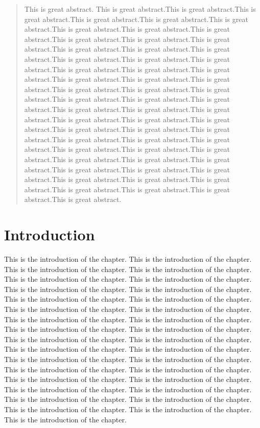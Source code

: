 \documentclass{nithreport}
\begin{document}
\tableofcontents
\listoftables
\listoffigures


\begin{abstract}
This is great abstract. This is great abstract.This is great abstract.This is great abstract.This is great abstract.This is great abstract.This is great abstract.This is great abstract.This is great abstract.This is great abstract.This is great abstract.This is great abstract.This is great abstract.This is great abstract.This is great abstract.This is great abstract.This is great abstract.This is great abstract.This is great abstract.This is great abstract.This is great abstract.This is great abstract.This is great abstract.This is great abstract.This is great abstract.This is great abstract.This is great abstract.This is great abstract.This is great abstract.This is great abstract.This is great abstract.This is great abstract.This is great abstract.This is great abstract.This is great abstract.This is great abstract.This is great abstract.This is great abstract.This is great abstract.This is great abstract.This is great abstract.This is great abstract.This is great abstract.This is great abstract.This is great abstract.This is great abstract.This is great abstract.This is great abstract.This is great abstract.This is great abstract.This is great abstract.This is great abstract.This is great abstract.This is great abstract.This is great abstract.This is great abstract.This is great abstract.This is great abstract.This is great abstract.
\end{abstract}


\chapter{Introduction}
This is the introduction of the chapter. This is the introduction of the chapter. This is the introduction of the chapter. This is the introduction of the chapter. This is the introduction of the chapter. This is the introduction of the chapter. This is the introduction of the chapter. This is the introduction of the chapter. This is the introduction of the chapter. This is the introduction of the chapter. This is the introduction of the chapter. This is the introduction of the chapter. This is the introduction of the chapter. This is the introduction of the chapter. This is the introduction of the chapter. This is the introduction of the chapter. This is the introduction of the chapter. This is the introduction of the chapter. This is the introduction of the chapter. This is the introduction of the chapter. This is the introduction of the chapter. This is the introduction of the chapter. This is the introduction of the chapter. This is the introduction of the chapter. This is the introduction of the chapter. This is the introduction of the chapter. This is the introduction of the chapter. This is the introduction of the chapter. This is the introduction of the chapter. This is the introduction of the chapter. This is the introduction of the chapter. This is the introduction of the chapter. This is the introduction of the chapter. 
\end{document}

